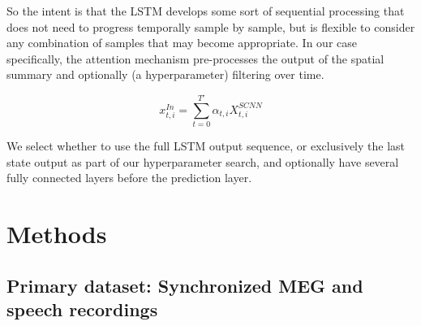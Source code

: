 \documentclass[fleqn,10pt]{wlscirep}
\begin{document}
So the intent is that the LSTM develops some sort of sequential processing that does not need to progress temporally sample by sample, but is flexible to consider any combination of samples that may become appropriate. In our case specifically, the attention mechanism pre-processes the output of the spatial summary and optionally (a hyperparameter) filtering over time.

\begin{equation}
  x_{t,i}^{In} = \sum_{t=0}^{T'} \alpha_{t,i} X_{t,i}^{SCNN}
\end{equation}

We select whether to use the full LSTM output sequence, or exclusively the last state output as part of our hyperparameter search, and optionally have several fully connected layers before the prediction layer.

\section*{Methods}

\subsection*{Primary dataset: Synchronized MEG and speech recordings}
\end{document}
